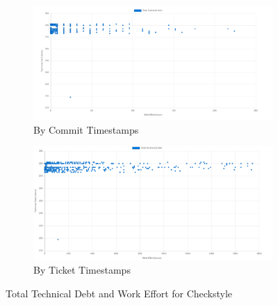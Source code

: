 \documentclass{mpaper}
\begin{document}
\begin{figure}[htp]
	\centering
	\begin{subfigure}{.45\textwidth}
		\includegraphics[width=\linewidth]{images/checkstyle_total_debt_commit.png}
		\caption{By Commit Timestamps}
		\label{fig:td-total-debt-commit}
	\end{subfigure}
	\begin{subfigure}{.45\textwidth}
		\includegraphics[width=\linewidth]{images/checkstyle_total_debt_ticket.png}
		\caption{By Ticket Timestamps}
		\label{fig:td-total-debt-ticket}
	\end{subfigure}
	\caption{Total Technical Debt and Work Effort for Checkstyle}
	\label{fig:td-total-debt}
\end{figure}
\end{document}
